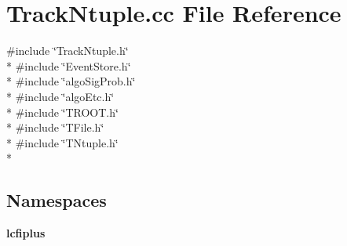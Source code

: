 \section{Track\-Ntuple.\-cc File Reference}
\label{TrackNtuple_8cc}
{\ttfamily \#include \char`\"{}Track\-Ntuple.\-h\char`\"{}}\\*
{\ttfamily \#include \char`\"{}Event\-Store.\-h\char`\"{}}\\*
{\ttfamily \#include \char`\"{}algo\-Sig\-Prob.\-h\char`\"{}}\\*
{\ttfamily \#include \char`\"{}algo\-Etc.\-h\char`\"{}}\\*
{\ttfamily \#include \char`\"{}T\-R\-O\-O\-T.\-h\char`\"{}}\\*
{\ttfamily \#include \char`\"{}T\-File.\-h\char`\"{}}\\*
{\ttfamily \#include \char`\"{}T\-Ntuple.\-h\char`\"{}}\\*
\subsection*{Namespaces}
\begin{DoxyCompactItemize}
\item 
{\bf lcfiplus}
\end{DoxyCompactItemize}
